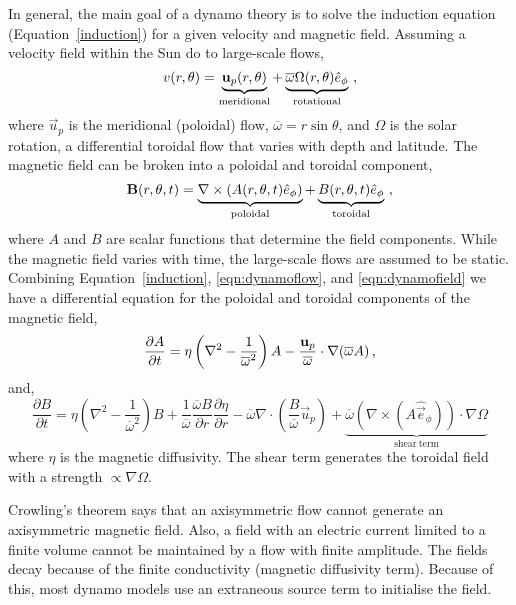 In general, the main goal of a dynamo theory is to solve the induction equation (Equation~\ref{induction}) for a given velocity and magnetic field. Assuming a velocity field within the Sun do to large-scale flows, 
\begin{equation}\label{eqn:dynamoflow}
v(r,\theta) = \underbrace{ \vec{u}_p(r,\theta) }_{\mathrm{meridional}} + \underbrace{ \overline{\omega} \Omega(r,\theta) \hat{e}_{\phi} }_{\mathrm{rotational}} \mbox{\,,}
\end{equation}
where $\vec{u}_p$ is the meridional (poloidal) flow, $\overline{\omega}=r\sin{\theta}$, and $\Omega $ is the solar rotation, a differential toroidal flow that varies with depth and latitude.
The magnetic field can be broken into a poloidal and toroidal component,
\begin{equation}\label{eqn:dynamofield}
\vec{B}(r,\theta,t) = \underbrace{ \nabla\times(A(r,\theta,t)\hat{e}_{\phi}) }_{\mathrm{poloidal}} + \underbrace{ B(r,\theta,t)\hat{e}_{\phi} }_{\mathrm{toroidal}} \mbox{\,,}
\end{equation}
where $A$ and $B$ are scalar functions that determine the field components.
While the magnetic field varies with time, the large-scale flows are assumed to be static. Combining Equation~\ref{induction}, \ref{eqn:dynamoflow}, and \ref{eqn:dynamofield} we have a differential equation for the poloidal and toroidal components of the magnetic field,
\begin{equation}\label{eqn:dadt}
\frac{\partial A}{\partial t} = \eta \left( \nabla^2 - \frac{1}{\overline{\omega}^2}\right) A - \frac{\vec{u}_p}{\overline{\omega}} \cdot \nabla(\overline{\omega} A) \mbox{\,,} %
\end{equation}
and,
\begin{equation}\label{eqn:dbdt}
\frac{\partial B}{\partial t} = \eta \left( \nabla^2 - \frac{1}{\overline{\omega}^2}\right) B + \frac{1}{\overline{\omega}} \frac{\overline{\omega}B}{\partial r}\frac{\partial \eta}{\partial r} - \overline{\omega}\nabla \cdot \left( \frac{B}{\overline{\omega}} \vec{u}_p \right) + \underbrace{ \overline{\omega}( \nabla \times (A\hat{\vec{e}}_{\phi}))\cdot\nabla\Omega }_{\mathrm{shear~term}} %
\end{equation}
where $\eta$ is the magnetic diffusivity. The shear term generates the toroidal field with a strength $\propto \nabla\Omega$.

Crowling's theorem says that an axisymmetric flow cannot generate an axisymmetric magnetic field. Also, a field with an electric current limited to a finite volume cannot be maintained by a flow with finite amplitude. The fields decay because of the finite conductivity (magnetic diffusivity term). Because of this, most dynamo models use an extraneous source term to initialise the field. 

